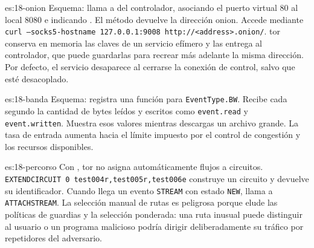 \begin{soluzione}{es:18-onion}
Esquema: llama a  del controlador, asociando el puerto virtual 80 al local 8080 e indicando . El método devuelve la dirección onion. Accede mediante \texttt{curl --socks5-hostname 127.0.0.1:9008 http://<address>.onion/}. tor conserva en memoria las claves de un servicio efímero y las entrega al controlador, que puede guardarlas para recrear más adelante la misma dirección. Por defecto, el servicio desaparece al cerrarse la conexión de control, salvo que esté desacoplado.
\end{soluzione}

\begin{soluzione}{es:18-banda}
Esquema: registra una función para \texttt{EventType.BW}. Recibe cada segundo la cantidad de bytes leídos y escritos como \texttt{event.read} y \texttt{event.written}. Muestra esos valores mientras descargas un archivo grande. La tasa de entrada aumenta hacia el límite impuesto por el control de congestión y los recursos disponibles.
\end{soluzione}

\begin{soluzione}{es:18-percorso}
Con , tor no asigna automáticamente flujos a circuitos. \texttt{EXTENDCIRCUIT 0 test004r,test005r,test006e} construye un circuito y devuelve su identificador. Cuando llega un evento \texttt{STREAM} con estado \texttt{NEW}, llama a \texttt{ATTACHSTREAM}. La selección manual de rutas es peligrosa porque elude las políticas de guardias y la selección ponderada: una ruta inusual puede distinguir al usuario o un programa malicioso podría dirigir deliberadamente su tráfico por repetidores del adversario.
\end{soluzione}
